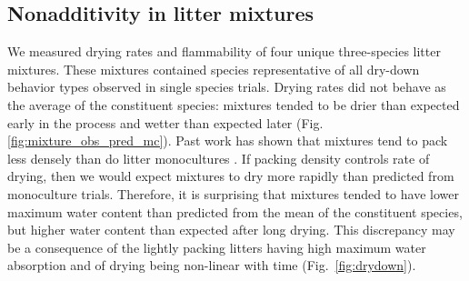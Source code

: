 \documentclass[letterpaper,12pt]{article}
\begin{document}

\subsection*{Nonadditivity in litter mixtures}

We measured drying rates and flammability of four unique three-species litter
mixtures. These mixtures contained species representative of all dry-down
behavior types observed in single species trials. Drying rates did not behave
as the average of the constituent species: mixtures tended to be drier than
expected early in the process and wetter than expected later (Fig.
\ref{fig:mixture_obs_pred_mc}). Past work has shown that mixtures tend to pack
less densely than do litter monocultures \citep{Magalhaes+Schwilk-2012}. If
packing density controls rate of drying, then we would expect mixtures to dry
more rapidly than predicted from monoculture trials. Therefore, it is
surprising that mixtures tended to have lower maximum water content than
predicted from the mean of the constituent species, but higher water content
than expected after long drying. This discrepancy may be a consequence of the
lightly packing litters having high maximum water absorption and of drying
being non-linear with time (Fig.~\ref{fig:drydown}).


\end{document}
